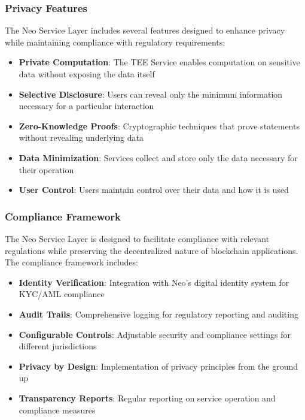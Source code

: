 \subsubsection{Privacy Features}
\label{subsubsec:privacy-features}

The Neo Service Layer includes several features designed to enhance privacy while maintaining compliance with regulatory requirements:

\begin{itemize}
    \item \textbf{Private Computation}: The TEE Service enables computation on sensitive data without exposing the data itself
    \item \textbf{Selective Disclosure}: Users can reveal only the minimum information necessary for a particular interaction
    \item \textbf{Zero-Knowledge Proofs}: Cryptographic techniques that prove statements without revealing underlying data
    \item \textbf{Data Minimization}: Services collect and store only the data necessary for their operation
    \item \textbf{User Control}: Users maintain control over their data and how it is used
\end{itemize}

\subsubsection{Compliance Framework}
\label{subsubsec:compliance-framework}

The Neo Service Layer is designed to facilitate compliance with relevant regulations while preserving the decentralized nature of blockchain applications. The compliance framework includes:

\begin{itemize}
    \item \textbf{Identity Verification}: Integration with Neo's digital identity system for KYC/AML compliance
    \item \textbf{Audit Trails}: Comprehensive logging for regulatory reporting and auditing
    \item \textbf{Configurable Controls}: Adjustable security and compliance settings for different jurisdictions
    \item \textbf{Privacy by Design}: Implementation of privacy principles from the ground up
    \item \textbf{Transparency Reports}: Regular reporting on service operation and compliance measures
\end{itemize}


